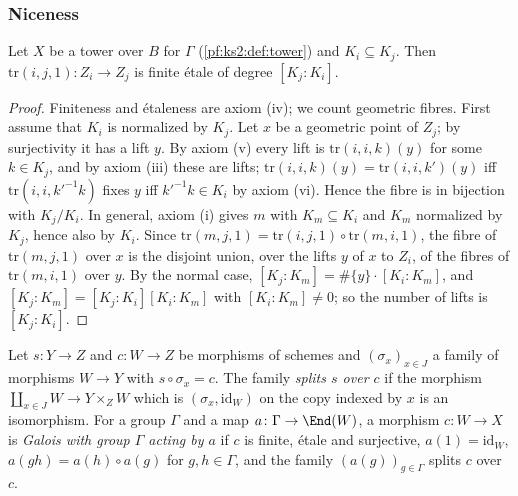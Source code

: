 \subsubsection{Niceness}

\begin{lemma}\label{pf:ks2:twfet}
Let $X$ be a tower over $B$ for $\Gamma$ (\cref{pf:ks2:def:tower}) and $K_i\subseteq K_j$. Then
$\mathrm{tr}(i,j,1)\colon Z_i\to Z_j$ is finite \'etale of degree $[K_j:K_i]$.
\end{lemma}

\begin{proof}
Finiteness and \'etaleness are axiom (iv); we count geometric fibres. First assume that $K_i$ is
normalized by $K_j$. Let $x$ be a geometric point of $Z_j$; by surjectivity it has a lift $y$.
By axiom (v) every lift is $\mathrm{tr}(i,i,k)(y)$ for some $k\in K_j$, and by axiom (iii) these
are lifts; $\mathrm{tr}(i,i,k)(y)=\mathrm{tr}(i,i,k')(y)$ iff $\mathrm{tr}(i,i,k'^{-1}k)$ fixes
$y$ iff $k'^{-1}k\in K_i$ by axiom (vi). Hence the fibre is in bijection with $K_j/K_i$. In
general, axiom (i) gives $m$ with $K_m\subseteq K_i$
and $K_m$ normalized by $K_j$, hence also by $K_i$. Since
$\mathrm{tr}(m,j,1)=\mathrm{tr}(i,j,1)\circ\mathrm{tr}(m,i,1)$, the fibre of $\mathrm{tr}(m,j,1)$
over $x$ is the disjoint union, over the lifts $y$ of $x$ to $Z_i$, of the fibres of
$\mathrm{tr}(m,i,1)$ over $y$. By the normal case,
$[K_j:K_m]=\#\{y\}\cdot[K_i:K_m]$, and $[K_j:K_m]=[K_j:K_i][K_i:K_m]$ with $[K_i:K_m]\neq0$; so
the number of lifts is $[K_j:K_i]$.
\end{proof}

\begin{definition}\label{pf:ks2:def:splits}
Let $s\colon Y\to Z$ and $c\colon W\to Z$ be morphisms of schemes and $(\sigma_x)_{x\in J}$ a family
of morphisms $W\to Y$ with $s\circ\sigma_x=c$. The family \emph{splits $s$ over $c$} if the morphism
$\coprod_{x\in J}W\to Y\times_ZW$ which is $(\sigma_x,\mathrm{id}_W)$ on the copy indexed by $x$ is an
isomorphism. For a group $\Gamma$ and a map $a\colon\Gamma\to\End(W)$, a morphism $c\colon W\to X$ is
\emph{Galois with group $\Gamma$ acting by $a$} if $c$ is finite, \'etale and surjective,
$a(1)=\mathrm{id}_W$, $a(gh)=a(h)\circ a(g)$ for $g,h\in\Gamma$, and the family $(a(g))_{g\in\Gamma}$
splits $c$ over $c$.
\end{definition}

